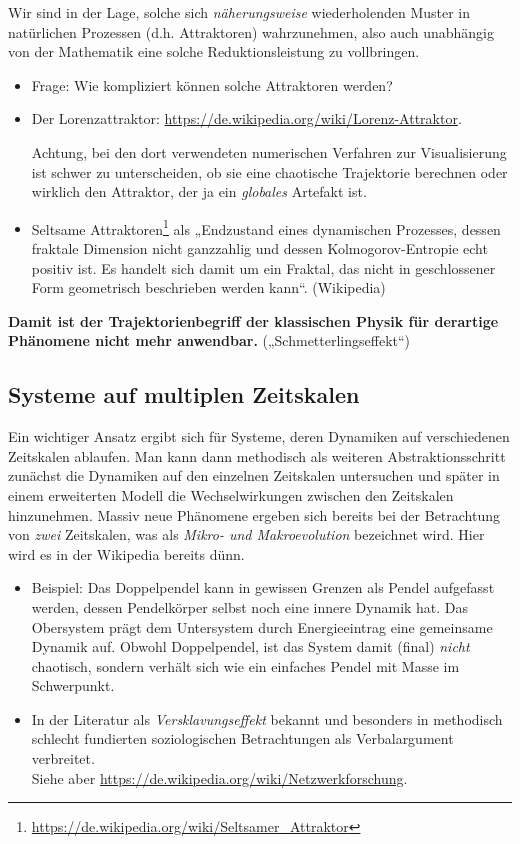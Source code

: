 \documentclass[11pt,a4paper]{article}
\begin{document}
Wir sind in der Lage, solche sich \emph{näherungsweise} wiederholenden Muster
in natürlichen Prozessen (d.h. Attraktoren) wahrzunehmen, also auch unabhängig
von der Mathematik eine solche Reduktionsleistung zu vollbringen.
\begin{itemize}
\item Frage: Wie kompliziert können solche Attraktoren werden?
\item Der Lorenzattraktor:
  \url{https://de.wikipedia.org/wiki/Lorenz-Attraktor}.
    
  Achtung, bei den dort verwendeten numerischen Verfahren zur Visualisierung
  ist schwer zu unterscheiden, ob sie eine chaotische Trajektorie berechnen
  oder wirklich den Attraktor, der ja ein \emph{globales} Artefakt ist.
\item Seltsame
  Attraktoren\footnote{\url{https://de.wikipedia.org/wiki/Seltsamer_Attraktor}}
  als „Endzustand eines dynamischen Prozesses, dessen fraktale Dimension nicht
  ganzzahlig und dessen Kolmogorov-Entropie echt positiv ist. Es handelt sich
  damit um ein Fraktal, das nicht in geschlossener Form geometrisch
  beschrieben werden kann“. (Wikipedia)
\end{itemize}
\textbf{Damit ist der Trajektorienbegriff der klassischen Physik für derartige
Phänomene nicht mehr anwendbar.} („Schmetterlingseffekt“)

\subsection{Systeme auf multiplen Zeitskalen}

Ein wichtiger Ansatz ergibt sich für Systeme, deren Dynamiken auf
verschiedenen Zeitskalen ablaufen. Man kann dann methodisch als weiteren
Abstraktionsschritt zunächst die Dynamiken auf den einzelnen Zeitskalen
untersuchen und später in einem erweiterten Modell die Wechselwirkungen
zwischen den Zeitskalen hinzunehmen.  Massiv neue Phänomene ergeben sich
bereits bei der Betrachtung von \emph{zwei} Zeitskalen, was als \emph{Mikro-
  und Makroevolution} bezeichnet wird. Hier wird es in der Wikipedia bereits
dünn.
\begin{itemize}
\item Beispiel: Das Doppelpendel kann in gewissen Grenzen als Pendel
  aufgefasst werden, dessen Pendelkörper selbst noch eine innere Dynamik hat.
  Das Obersystem prägt dem Untersystem durch Energieeintrag eine gemeinsame
  Dynamik auf.  Obwohl Doppelpendel, ist das System damit (final) \emph{nicht}
  chaotisch, sondern verhält sich wie ein einfaches Pendel mit Masse im
  Schwerpunkt.
\item In der Literatur als \emph{Versklavungseffekt} bekannt und besonders in
  methodisch schlecht fundierten soziologischen Betrachtungen als
  Verbalargument verbreitet.\\  Siehe aber
  \url{https://de.wikipedia.org/wiki/Netzwerkforschung}.
\end{itemize}
\end{document}
